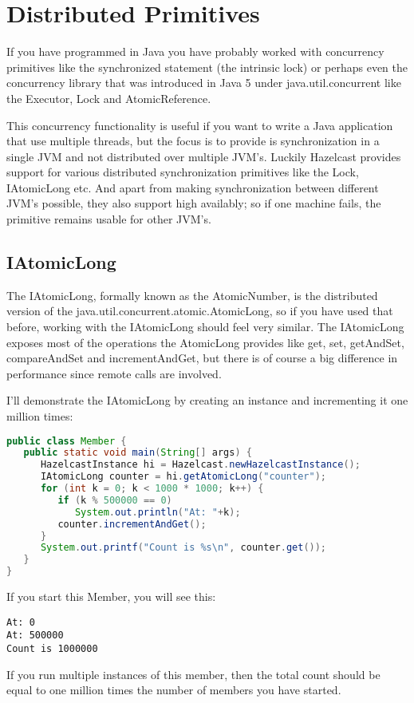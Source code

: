 \chapter{Distributed Primitives}
If you have programmed in Java you have probably worked with concurrency primitives like the synchronized statement (the intrinsic lock) or perhaps even the concurrency library that was introduced in Java 5 under java.util.concurrent like the Executor, Lock and AtomicReference.

This concurrency functionality is useful if you want to write a Java application that use multiple threads, but the focus is to provide is synchronization in a single JVM and not distributed over multiple JVM's. Luckily Hazelcast provides support for various distributed synchronization primitives like the Lock, IAtomicLong etc. And apart from making synchronization between different JVM's possible, they also support high availably; so if one machine fails, the primitive remains usable for other JVM's.

\section{IAtomicLong}
The IAtomicLong, formally known as the AtomicNumber, is the distributed version of the java.util.concurrent.atomic.AtomicLong, so if you have used that before, working with the IAtomicLong should feel very similar. The IAtomicLong exposes most of the operations the AtomicLong provides like get, set, getAndSet, compareAndSet and incrementAndGet, but there is of course a big difference in performance since remote calls are involved.

I'll demonstrate the IAtomicLong by creating an instance and incrementing it one million times:
\begin{lstlisting}[language=java]
public class Member {
   public static void main(String[] args) {
      HazelcastInstance hi = Hazelcast.newHazelcastInstance();
      IAtomicLong counter = hi.getAtomicLong("counter");
      for (int k = 0; k < 1000 * 1000; k++) {
         if (k % 500000 == 0) 
            System.out.println("At: "+k);
         counter.incrementAndGet();
      }
      System.out.printf("Count is %s\n", counter.get());
   }
}
\end{lstlisting}
If you start this Member, you will see this:
\begin{lstlisting}
At: 0
At: 500000
Count is 1000000
\end{lstlisting}
If you run multiple instances of this member, then the total count should be equal to one million times the number of members you have started.

